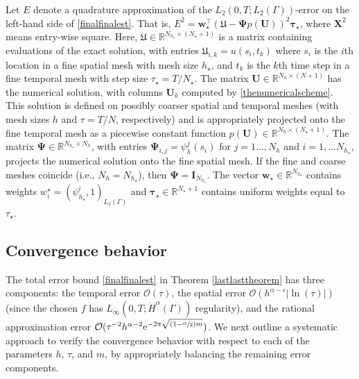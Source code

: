 \documentclass[numbers,webpdf]{ima-authoring-template}%
\theoremstyle{thmstyletwo}%
\numberwithin{equation}{section}
\begin{document}
Let $E$ denote a quadrature approximation of the $L_2(0,T;L_2(\Gamma))$-error on the left-hand side of \eqref{finalfinalest}. That is, $E^2 = \mathbf{w}^\top_{\star}(\boldsymbol{\mathfrak{U}}- \boldsymbol{\Psi}p(\mathbf{U}))^2\boldsymbol{\tau}_{\star}$, where $\mathbf{X}^2$ means entry-wise square. Here, $\boldsymbol{\mathfrak{U}}\in\mathbb{R}^{N_{h_\star}\times (N_\star+1)}$ is a matrix containing evaluations of the exact solution, with entries $\boldsymbol{\mathfrak{U}}_{i,k} = u(s_i,t_k)$ where $s_i$ is the $i$th location in a fine spatial mesh with mesh size $h_{\star}$, and $t_k$ is the $k$th time step in a fine temporal mesh with step size $\tau_{\star} = T/N_\star$. The matrix $\mathbf{U}\in\mathbb{R}^{N_{h}\times (N+1)}$ has the numerical solution, with columns $\mathbf{U}_k$ computed by \eqref{thenumericalscheme}. This solution is defined on possibly coarser spatial and temporal meshes (with mesh sizes $h$ and $\tau=T/N$, respectively) and is appropriately projected onto the fine temporal mesh as a piecewise constant function $p(\mathbf{U})\in\mathbb{R}^{N_{h}\times (N_\star+1)}$.  The matrix $\boldsymbol{\Psi}\in\mathbb{R}^{N_{h_\star}\times N_h}$, with entries $\boldsymbol{\Psi}_{i,j}=\psi^j_h(s_i)$ for $j=1\dots, N_h$ and $i = 1,\dots N_{h_{\star}}$, projects the numerical solution onto the fine spatial mesh. If the fine and coarse meshes coincide (i.e., $N_h = N_{h_{\star}}$), then $\boldsymbol{\Psi} = \mathbf{I}_{N_{h_{\star}}}$. The vector $\mathbf{w}_{\star}\in\mathbb{R}^{N_{h_\star}}$ contains weights $w_i^\star = (\psi^i_{h_{\star}},1)_{L_2(\Gamma)}$ and $\boldsymbol{\tau}_{\star}\in\mathbb{R}^{N_\star+1}$ contains uniform weights equal to $\tau_{\star}$.

\subsection{Convergence behavior}
The total error bound \eqref{finalfinalest} in Theorem \ref{lastlasttheorem} has three components: the temporal error $\mathcal{O}(\tau)$, the spatial error $\mathcal{O}(h^{\alpha-\epsilon}|\ln(\tau)|)$ (since the chosen $f$ has $ L_\infty(0,T;\dot{H}^{\alpha}(\Gamma))$ regularity), and the rational approximation error $\mathcal{O}(\tau^{-2}h^{\alpha-2}\text{e}^{-2\pi\sqrt{(1-\sfrac{\alpha}{2})m}})$. We next outline a systematic approach to verify the convergence behavior with respect to each of the parameters $h$, $\tau$, and $m$, by appropriately balancing the remaining error components. 
\end{document}
